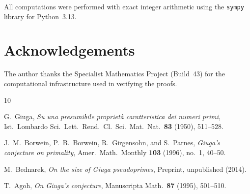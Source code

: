\documentclass[12pt,a4paper]{amsart}
\theoremstyle{definition}
\begin{document}
All computations were performed with exact integer arithmetic using the
\texttt{sympy} library for Python~3.13.

\section*{Acknowledgements}

The author thanks the Specialist Mathematics Project (Build~43) for the
computational infrastructure used in verifying the proofs.

\begin{thebibliography}{10}

G.~Giuga,
\emph{Su una presumibile propriet\`a caratteristica dei numeri primi},
Ist.\ Lombardo Sci.\ Lett.\ Rend.\ Cl.\ Sci.\ Mat.\ Nat.\ \textbf{83}
(1950), 511--528.

J.~M.~Borwein, P.~B.~Borwein, R.~Girgensohn, and S.~Parnes,
\emph{Giuga's conjecture on primality},
Amer.\ Math.\ Monthly \textbf{103} (1996), no.\ 1, 40--50.

M.~Bednarek,
\emph{On the size of Giuga pseudoprimes},
Preprint, unpublished (2014).

T.~Agoh,
\emph{On Giuga's conjecture},
Manuscripta Math.\ \textbf{87} (1995), 501--510.

\end{thebibliography}
\end{document}
